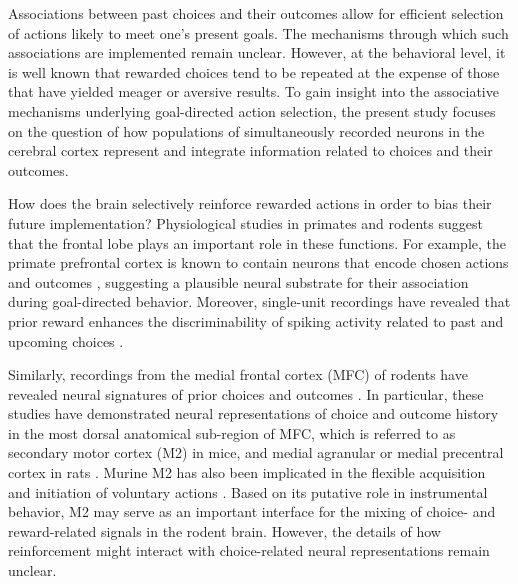 
Associations between past choices and their outcomes allow for efficient selection of actions likely to meet one’s present goals. The mechanisms through which such associations are implemented remain unclear. However, at the behavioral level, it is well known that rewarded choices tend to be repeated at the expense of those that have yielded meager or aversive results. To gain insight into the associative mechanisms underlying goal-directed action selection, the present study focuses on the question of how populations of simultaneously recorded neurons in the cerebral cortex represent and integrate information related to choices and their outcomes.

How does the brain selectively reinforce rewarded actions in order to bias their future implementation? Physiological studies in primates and rodents suggest that the frontal lobe plays an important role in these functions. For example, the primate prefrontal cortex is known to contain neurons that encode chosen actions and outcomes \citep{barraclough2004prefrontal,genovesio2006representation,seo2007dynamic,histed2009learning}, suggesting a plausible neural substrate for their association during goal-directed behavior. Moreover, single-unit recordings have revealed that prior reward enhances the discriminability of spiking activity related to past \citep{donahue2013cortical} and upcoming choices \citep{histed2009learning}.

Similarly, recordings from the medial frontal cortex (MFC) of rodents have revealed neural signatures of prior choices and outcomes \citep{sul2010distinct, sul2011role, hyman2017novel}. In particular, these studies have demonstrated neural representations of choice and outcome history in the most dorsal anatomical sub-region of MFC, which is referred to as secondary motor cortex (M2) in mice, and medial agranular or medial precentral cortex in rats \citep{sesack1989topographical, barthas2017secondary}. Murine M2 has also been implicated in the flexible acquisition and initiation of voluntary actions \citep{ostlund2009evidence, gremel2013premotor, murakami2014neural, siniscalchi2016fast, barthas2017secondary, makino2017transformation}. Based on its putative role in instrumental behavior, M2 may serve as an important interface for the mixing of choice- and reward-related signals in the rodent brain. However, the details of how reinforcement might interact with choice-related neural representations remain unclear. 

